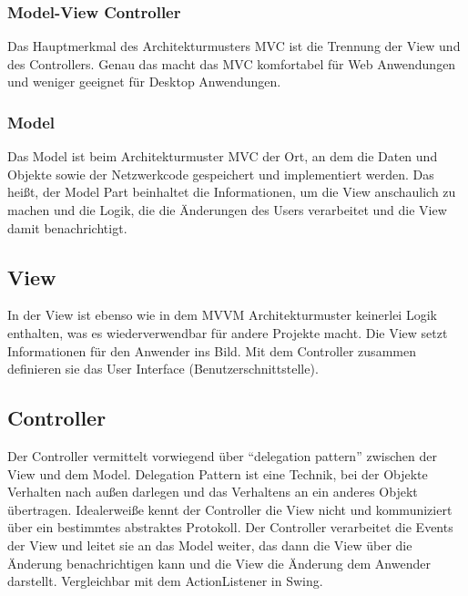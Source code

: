 \setcounter{secnumdepth}{3}
\subsubsection{Model-View Controller}
Das Hauptmerkmal des Architekturmusters \ac{MVC} ist die Trennung der View und des Controllers. Genau das macht das MVC komfortabel f\"ur Web Anwendungen und weniger geeignet f\"ur Desktop Anwendungen\cite{Syromiatnikov2014}.

\subsubsection*{Model}
Das Model ist beim Architekturmuster \ac{MVC} der Ort, an dem die Daten und Objekte sowie der Netzwerkcode gespeichert und implementiert werden. Das hei\ss{}t, der Model Part beinhaltet die Informationen, um die View anschaulich zu machen und die Logik, die die \"Anderungen des Users verarbeitet und die View damit benachrichtigt\cite{Leff2001}.
\subsection*{View}
In der View ist ebenso wie in dem \ac{MVVM} Architekturmuster keinerlei Logik enthalten, was es wiederverwendbar f\"ur andere Projekte macht.\cite{Peres2016} Die View setzt Informationen f\"ur den Anwender ins Bild. Mit dem Controller zusammen definieren sie das User Interface (Benutzerschnittstelle)\cite{Leff2001}.
\subsection*{Controller}
Der Controller vermittelt vorwiegend \"uber \enquote{delegation pattern} zwischen der View und dem Model. Delegation Pattern ist eine Technik, bei der Objekte Verhalten nach au\ss{}en darlegen und das Verhaltens an ein anderes Objekt \"ubertragen\cite{TU-Wien2013}. Idealerwei\ss{}e kennt der Controller die View nicht und kommuniziert \"uber ein bestimmtes abstraktes Protokoll\cite{Peres2016}.
Der Controller verarbeitet die Events der View und leitet sie an das Model weiter, das dann die View \"uber die \"Anderung benachrichtigen kann und die View die \"Anderung dem Anwender darstellt. Vergleichbar mit dem ActionListener in Swing\cite{Singer2004}.
